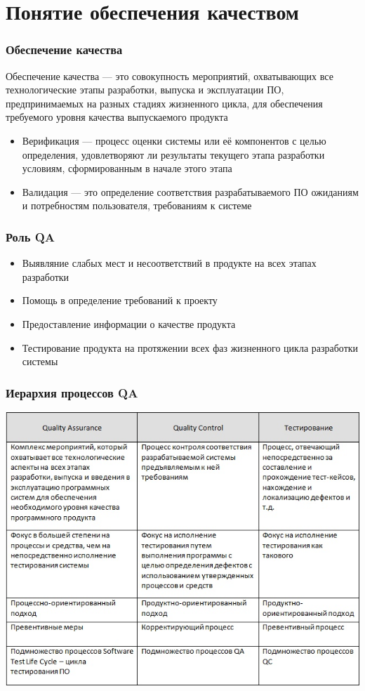 \documentclass{../industrial-development}
\begin{document}
	\section{Понятие обеспечения качеством}
	\begin{frame} \frametitle {Обеспечение качества}
		\begin{block}{}
			\alert{Обеспечение качества} --- это совокупность мероприятий, охватывающих все технологические этапы разработки, выпуска и эксплуатации ПО, предпринимаемых на разных стадиях жизненного цикла, для обеспечения требуемого уровня качества выпускаемого продукта	
		\end{block}
		\begin{itemize}
			\item Верификация --- процесс оценки системы или её компонентов с целью определения, удовлетворяют ли результаты текущего этапа разработки условиям, сформированным в начале этого этапа
			\item Валидация --- это определение соответствия разрабатываемого ПО ожиданиям и потребностям пользователя, требованиям к системе
		\end{itemize}
	\end{frame}
	\begin{frame} \frametitle {Роль QA}
	\begin{itemize}
		\item Выявляние слабых мест и несоответствий в продукте на всех этапах разработки
		\item Помощь в определение требований к проекту
		\item Предоставление информации о качестве продукта
		\item Тестирование продукта на протяжении всех фаз жизненного цикла разработки системы 
	\end{itemize}
\end{frame}	
	
	\begin{frame} \frametitle{Иерархия процессов QA}
		\centerline{\includegraphics[height=0.7\textheight]{QA_QC.png}}
	\end{frame}
	
\end{document}
